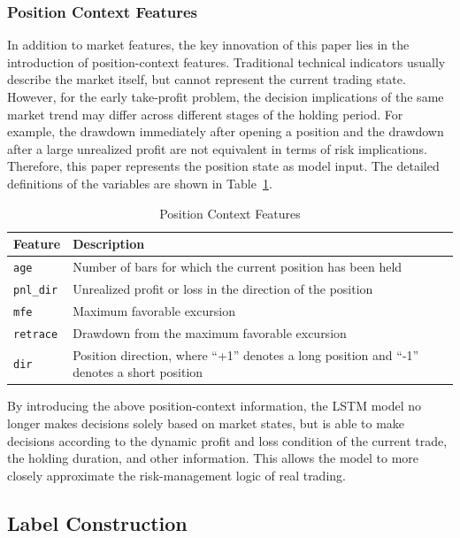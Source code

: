 \documentclass[12pt]{article}
\begin{document}
\subsubsection{Position Context Features}

In addition to market features, the key innovation of this paper lies in the introduction of 
position-context features. Traditional technical indicators usually describe the market itself, 
but cannot represent the current trading state. However, for the early take-profit problem, the 
decision implications of the same market trend may differ across different stages of the 
holding period. For example, the drawdown immediately after opening a position and the drawdown 
after a large unrealized profit are not equivalent in terms of risk implications. Therefore, 
this paper represents the position state as model input. The detailed definitions of the 
variables are shown in Table~\ref{tab:position_context_features}.

\begin{table}[htbp]
\centering
\caption{Position Context Features}
\label{tab:position_context_features}
\small
\renewcommand{\arraystretch}{1.2}
\begin{tabular}{p{}p{}}
\toprule
Feature & Description \\
\midrule
\texttt{age} & Number of bars for which the current position has been held \\
\texttt{pnl\_dir} & Unrealized profit or loss in the direction of the position \\
\texttt{mfe} & Maximum favorable excursion \\
\texttt{retrace} & Drawdown from the maximum favorable excursion \\
\texttt{dir} & Position direction, where ``+1'' denotes a long position and ``-1'' denotes a short position \\
\bottomrule
\end{tabular}
\end{table}

By introducing the above position-context information, the LSTM model no longer makes decisions 
solely based on market states, but is able to make decisions according to the dynamic profit 
and loss condition of the current trade, the holding duration, and other information. This 
allows the model to more closely approximate the risk-management logic of real trading.

\subsection{Label Construction}
\end{document}
